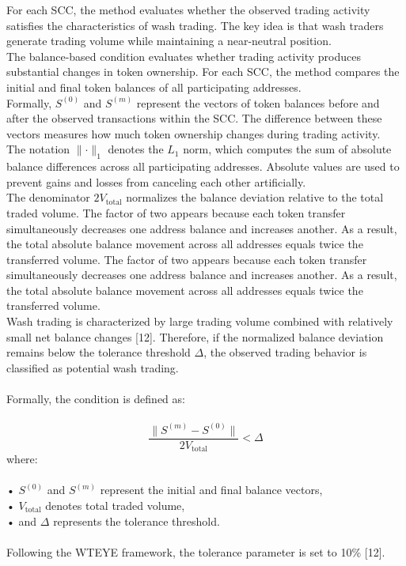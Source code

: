 \documentclass[language=english,thesis=bachelor,nosecondtitle,faculty=cb,onesided,12pt]{hsmw-thesis}
\begin{document}
For each SCC, the method evaluates whether the observed trading activity satisfies the characteristics of wash trading. The key idea is that wash traders generate trading volume while maintaining a near-neutral position.\\
The balance-based condition evaluates whether trading activity produces substantial changes in token ownership. For each SCC, the method compares the initial and final token balances of all participating addresses.\\
Formally, $S^{(0)}$ and $S^{(m)}$ represent the vectors of token balances before and after the observed transactions within the SCC. The difference between these vectors measures how much token ownership changes during trading activity.\\
The notation $\lVert \cdot \rVert_1$  denotes the $L_1$  norm, which computes the sum of absolute balance differences across all participating addresses. Absolute values are used to prevent gains and losses from canceling each other artificially.\\
The denominator $2V_{\text{total}}$ normalizes the balance deviation relative to the total traded volume. The factor of two appears because each token transfer simultaneously decreases one address balance and increases another. As a result, the total absolute balance movement across all addresses equals twice the transferred volume. The factor of two appears because each token transfer simultaneously decreases one address balance and increases another. As a result, the total absolute balance movement across all addresses equals twice the transferred volume.\\
Wash trading is characterized by large trading volume combined with relatively small net balance changes [12]. Therefore, if the normalized balance deviation remains below the tolerance threshold $\Delta$, the observed trading behavior is classified as potential wash trading.\\
\\
Formally, the condition is defined as:\\
\\
\begin{equation}
    \frac{\lVert S^{(m)} - S^{(0)} \rVert}{2V_{\text{total}}} < \Delta
    \label{eq:volume_bound}
\end{equation}
where:\\
\\
•	$S^{(0)}$ and $S^{(m)}$  represent the initial and final balance vectors,\\
•	$V_{\text{total}}$  denotes total traded volume,\\
•	and $\Delta$ represents the tolerance threshold.\\
\\
Following the WTEYE framework, the tolerance parameter is set to 10\% [12].
\end{document}
